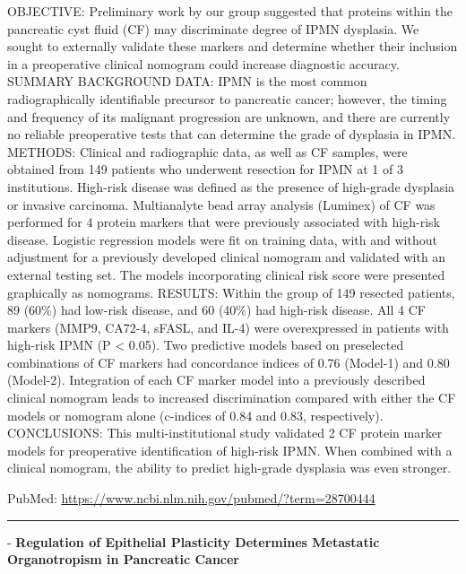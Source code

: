 \documentclass[]{article}
\begin{document}
OBJECTIVE: Preliminary work by our group suggested that proteins within
the pancreatic cyst fluid (CF) may discriminate degree of IPMN
dysplasia. We sought to externally validate these markers and determine
whether their inclusion in a preoperative clinical nomogram could
increase diagnostic accuracy. SUMMARY BACKGROUND DATA: IPMN is the most
common radiographically identifiable precursor to pancreatic cancer;
however, the timing and frequency of its malignant progression are
unknown, and there are currently no reliable preoperative tests that can
determine the grade of dysplasia in IPMN. METHODS: Clinical and
radiographic data, as well as CF samples, were obtained from 149
patients who underwent resection for IPMN at 1 of 3 institutions.
High-risk disease was defined as the presence of high-grade dysplasia or
invasive carcinoma. Multianalyte bead array analysis (Luminex) of CF was
performed for 4 protein markers that were previously associated with
high-risk disease. Logistic regression models were fit on training data,
with and without adjustment for a previously developed clinical nomogram
and validated with an external testing set. The models incorporating
clinical risk score were presented graphically as nomograms. RESULTS:
Within the group of 149 resected patients, 89 (60\%) had low-risk
disease, and 60 (40\%) had high-risk disease. All 4 CF markers (MMP9,
CA72-4, sFASL, and IL-4) were overexpressed in patients with high-risk
IPMN (P \textless{} 0.05). Two predictive models based on preselected
combinations of CF markers had concordance indices of 0.76 (Model-1) and
0.80 (Model-2). Integration of each CF marker model into a previously
described clinical nomogram leads to increased discrimination compared
with either the CF models or nomogram alone (c-indices of 0.84 and 0.83,
respectively). CONCLUSIONS: This multi-institutional study validated 2
CF protein marker models for preoperative identification of high-risk
IPMN. When combined with a clinical nomogram, the ability to predict
high-grade dysplasia was even stronger.

PubMed: \url{https://www.ncbi.nlm.nih.gov/pubmed/?term=28700444}

{}

{}

\begin{center}\rule{0.5\linewidth}{\linethickness}\end{center}

 - \textbf{Regulation of Epithelial Plasticity Determines Metastatic
Organotropism in Pancreatic Cancer}
\end{document}
